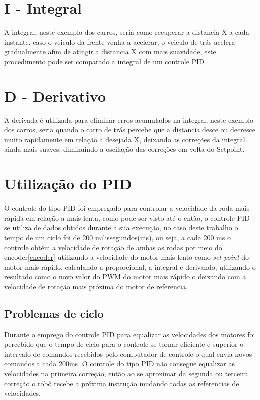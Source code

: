 \documentclass[a4paper,12pt,portuguese]{ufms-cpcx}
\begin{document}
\section{I - Integral}
A integral, neste exemplo dos carros, seria como recuperar a distancia X a cada instante, caso o veiculo da frente venha a acelerar, o veiculo de trás acelera gradualmente afim de atingir a distancia X com mais suavidade, este procedimento pode ser comparado a integral de um controle PID.

\section{D - Derivativo}
A derivada é utilizada para eliminar erros acumulados na integral, neste exemplo dos carros, seria quando o carro de trás percebe que a distancia desce ou decresce muito rapidamente em relação a desejada X, deixando as correções da integral ainda mais suaves, diminuindo a oscilação das correções em volta do Setpoint.

\section{Utilização do PID}
O controle do tipo PID foi empregado para controlar a velocidade da roda mais rápida em relação a mais lenta, como pode ser visto até o então, o controle PID se utiliza de dados obtidos durante a sua execução, no caso deste trabalho o tempo de um ciclo foi de 200 milissegundos(ms), ou seja, a cada 200 ms o controle obtém a velocidade de rotação de ambas as rodas por meio do encoder\ref{encoder} utilizando a velocidade do motor mais lento como \textit{set point} do motor mais rápido, calculando a proporcional, a integral e derivando, utilizando o resultado como o novo valor do PWM do motor mais rápido o deixando com a velocidade de rotação mais próxima do motor de referencia.

\subsection{Problemas de ciclo}
Durante o emprego do controle PID para equalizar as velocidades dos motores foi percebido que o tempo de ciclo para o controle se tornar eficiente é superior o intervalo de comandos recebidos pelo computador de controle o qual envia novos comandos a cada 200ms. O controle do tipo PID não consegue equalizar as velocidades na primeira correção, então ao se aproximar da segunda ou terceira correção o robô recebe a próxima instrução mudando todas as referencias de velocidades.
\end{document}
